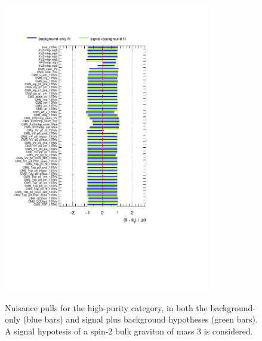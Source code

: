 \begin{figure}[!h]
   \caption{Nuisance pulls for the high-purity category, in both the background-only (blue bars) and signal plus background hypotheses (green bars). A signal hypotesis of a spin-2 bulk graviton of mass 3 \TeV is considered.}
 \begin{center}
   \includegraphics[width=0.8\textwidth]{pulls_VZ_data_1fb/pulls_XZZInv_hp3000.pdf}
   \label{fig:pulls_hp}
 \end{center}
\end{figure}


